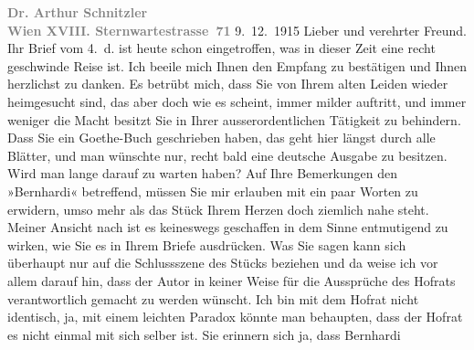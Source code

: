 \begin{ledgroupsized}[t]{13cm}
           \noindent{}{\pb}\textcolor{gray}{\textbf{Dr. Arthur Schnitzler}}{\\}\textcolor{gray}{\textbf{Wien XVIII. Sternwartestrasse 71}}\pend
           \pstart
           \raggedleft{}9. 12. 1915\pend
           \pstart\center{}Lieber und verehrter Freund.\pend\pstart
           Ihr Brief vom 4. d. ist heute schon eingetroffen, was in dieser Zeit
               eine recht geschwinde Reise ist. Ich beeile mich Ihnen den Empfang zu bestätigen und
               Ihnen herzlichst zu danken. Es betrübt mich, dass Sie von Ihrem alten Leiden wieder
               heimgesucht sind, das aber doch wie es scheint, immer milder auftritt, und immer
               weniger die Macht besitzt Sie in Ihrer ausserordentlichen Tätigkeit zu behindern.
               Dass Sie ein Goethe-Buch geschrieben haben, das geht
               hier längst durch alle Blätter, und man wünschte nur, recht bald eine deutsche
               Ausgabe zu besitzen. Wird man lange darauf zu warten haben?\pend
           \pstart
           Auf Ihre Bemerkungen den »Bernhardi« betreffend,
               müssen Sie mir erlauben mit ein paar Worten zu erwidern, umso mehr als das Stück
               Ihrem Herzen doch ziemlich nahe steht. Meiner Ansicht nach ist es keineswegs
               geschaffen in {\pb}dem Sinne entmutigend zu wirken,
               wie Sie es in Ihrem Briefe ausdrücken. Was Sie sagen kann sich überhaupt nur auf die
               Schlussszene des Stücks beziehen und da weise ich vor allem darauf hin, dass der
               Autor in keiner Weise für die Aussprüche des Hofrats verantwortlich gemacht zu werden
               wünscht. Ich bin mit dem Hofrat nicht identisch, ja, mit einem leichten Paradox
               könnte man behaupten, dass der Hofrat es nicht einmal mit sich selber ist. Sie
               erinnern sich ja, dass Bernhardi

\end{ledgroupsized}
